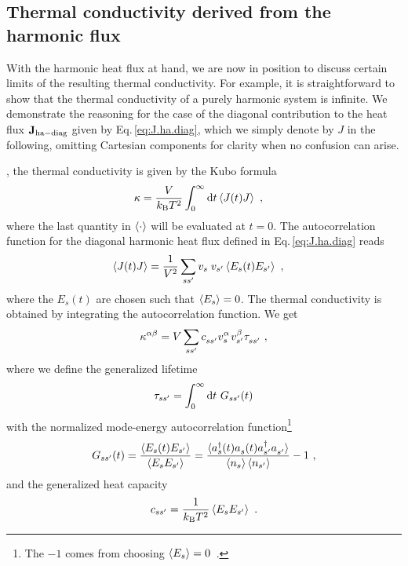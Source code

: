 \subsection{Thermal conductivity derived from the harmonic flux}
\label{sec:hf.kappa.ha}
{With the harmonic heat flux at hand}, we are now in position to discuss certain limits of the resulting thermal conductivity. For example, it is straightforward to show that the thermal conductivity of a purely harmonic system is infinite. 
We demonstrate the reasoning for the case of the diagonal contribution to the heat flux ${\bf J}_{\rm ha-diag}$ given by Eq.\,\eqref{eq:J.ha.diag}, which we simply denote by $J$ in the following, omitting Cartesian components for clarity when no confusion can arise.

, the thermal conductivity is given by the Kubo formula
\begin{align}
	\kappa
		&=
		\frac{V}{k_{\rm B} T^2} \int_{0}^{\infty} 
		\d t \braket{J (t) J} ~,
	\label{eq:flux.ha.k}
\end{align}
where the last quantity in $\braket{\cdot}$ will be evaluated at $t=0$.
The autocorrelation function for the diagonal harmonic heat flux defined in Eq.\,\eqref{eq:J.ha.diag} reads
\begin{align}
	\braket{J(t) J} 
		&= \frac{1}{V^2} \sum_{ss'} v_{\fP s} v_{s'}
			\braket{E_s (t) E_{s'}}~,
	\label{eq:ha.kappa.dJ.corr}
\end{align}
where the $E_s (t)$ are chosen such that $\braket{E_s} = 0$. The thermal conductivity is obtained by integrating the autocorrelation function. We get
\begin{align}
	\kappa^{\alpha \beta}
		= V \sum_{ss'} \fD c_{ss'} v^\alpha_{\fP s} v^\beta_{s'} \fD \tau_{ss'}~,
	\label{eq:kappa_ss}
\end{align}
where we define the generalized lifetime
\begin{align}
	\tau_{ss'} 
		=	\int_{0}^{\infty} \d t ~ G_{ss'} (t)
	\label{eq:tau_ss}
\end{align}
with the normalized mode-energy autocorrelation function\footnote{The $-1$ comes from choosing $\braket{E_s} =0$~.}
\begin{align}
	G_{ss'} (t)
		= \frac{\braket{E_s (t) E_{s'}}}{\braket{E_s E_{s'}}}
	  = \frac{\braket{\D a_s (t) \fD{a}_s (t) \D a_{s'} \fD a_{s'}}}{\braket{n_s} \braket{n_{s'}}} - 1~,
	\label{eq:G_ss}
\end{align}
and the generalized heat capacity
\begin{align}
	c_{ss'} = \frac{1}{k_{\rm B} T^2} \braket{E_s E_{s'}}~.
	\label{c_ss}
\end{align}

